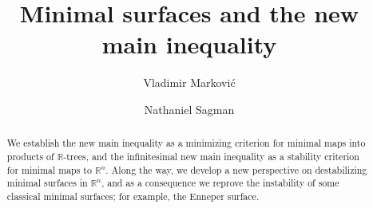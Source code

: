 \documentclass[10pt]{amsart}
\newcommand{\R}{\mathbb R}
\theoremstyle{definition}
\begin{document}
\title{Minimal surfaces and the new main inequality}
\author[Vladimir Markovi{\'c}]{Vladimir Markovi{\'c}}
\address{Vladimir Markovi{\'c}: University of Oxford, All Souls College, Oxford, OX1 4AL, UK.}  
\author[Nathaniel Sagman]{Nathaniel Sagman}
\address{Nathaniel Sagman: University of Luxembourg, 2 Av. de l'Universite, 4365 Esch-sur-Alzette, Luxembourg.} 

\begin{abstract}
We establish the new main inequality as a minimizing criterion for minimal maps into products of $\R$-trees, and the infinitesimal new main inequality as a stability criterion for minimal maps to $\R^n$. Along the way, we develop a new perspective on destabilizing minimal surfaces in $\R^n$, and as a consequence we reprove the instability of some classical minimal surfaces; for example, the Enneper surface.
\end{abstract}
\maketitle
\end{document}
